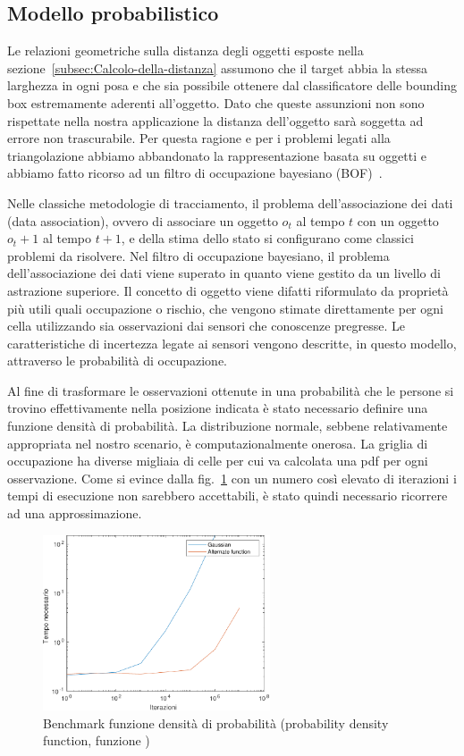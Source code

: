 \documentclass[a4paper]{article}
\begin{document}
	
	\subsection{Modello probabilistico}\label{subsec:Modello-probabilistico}
	Le relazioni geometriche sulla distanza degli oggetti esposte nella
	sezione~\ref{subsec:Calcolo-della-distanza} assumono che il target abbia la
	stessa larghezza in ogni posa e che sia possibile ottenere dal
	classificatore delle bounding box estremamente aderenti all'oggetto. Dato che queste
	assunzioni non sono rispettate nella nostra applicazione la distanza
	dell'oggetto sarà soggetta ad errore non trascurabile. Per questa
	ragione e per i problemi legati alla triangolazione abbiamo abbandonato la
	rappresentazione basata su oggetti e abbiamo fatto ricorso ad un filtro di
	occupazione bayesiano (BOF)~\cite{tay2008bayesian}.

	Nelle classiche metodologie di tracciamento, il problema dell'associazione dei dati (data association), ovvero di associare un oggetto $o_t$ al tempo $t$ con un oggetto $o_t+1$ al tempo $t+1$, e della stima dello stato si configurano come classici problemi da risolvere. Nel filtro di occupazione bayesiano, il problema dell'associazione dei dati viene superato in quanto viene gestito da un livello di astrazione superiore. Il concetto di oggetto viene difatti riformulato da proprietà più utili quali occupazione o rischio, che vengono stimate direttamente per ogni cella utilizzando sia osservazioni dai sensori che conoscenze pregresse. Le caratteristiche di incertezza legate ai sensori vengono descritte, in questo modello, attraverso le probabilità di occupazione.

	Al fine di trasformare le osservazioni ottenute in una probabilità che le
	persone si trovino effettivamente nella posizione indicata è stato
	necessario definire una funzione densità di probabilità. La distribuzione
	normale, sebbene relativamente appropriata nel nostro scenario, è
	computazionalmente onerosa. La griglia di occupazione ha diverse migliaia
	di celle per cui va calcolata una pdf per ogni osservazione. Come si evince
	dalla fig.~\ref{fig:pdf_benchmark} con un numero così elevato di iterazioni
	i tempi di esecuzione non sarebbero accettabili, è stato quindi necessario
	ricorrere ad una approssimazione.
	
	\begin{figure}[H]
		\centering
		\includegraphics[width=0.6\textwidth]{./img/pdf_benchmark.pdf}
		\caption{Benchmark funzione densità di probabilità (probability density function, funzione )}
		\label{fig:pdf_benchmark}
	\end{figure}
\end{document}
